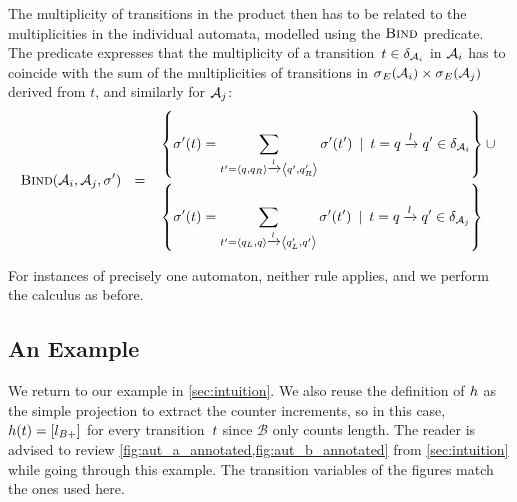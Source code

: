 The multiplicity of transitions in the product then has to be related
to the multiplicities in the individual automata, modelled using the
$\textsc{Bind}$ predicate. The predicate expresses that the multiplicity
of a transition~$t \in \delta_{\mathcal{A}_i}$ in
$\mathcal{A}_i$ has to coincide with the sum of the multiplicities of
transitions in $\operatorname{\sigma}_{E}(\mathcal{A}_i) \times \operatorname{\sigma}_{E}(\mathcal{A}_j)$ derived from $t$,
and similarly for $\mathcal{A}_j$:
%
  $$
  \textsc{Bind}(\mathcal{A}_i, \mathcal{A}_j, \operatorname{\sigma}') ~~=~~
  \begin{aligned}
  & \left\{ 
    \operatorname{\sigma}'(t)  =  \sum\limits_{t' = \left\langle q, q_R\right\rangle \xrightarrow{l} \left\langle q', q'_R\right\rangle} \operatorname{\sigma}'(t')
  \:\mid\: t = q \xrightarrow{l} q' \in \delta_{\mathcal{A}_i} \right\} \cup\mbox{} \\ 
  & \left\{
    \operatorname{\sigma}'(t)  =  \sum\limits_{t' = \left\langle q_L, q\right\rangle \xrightarrow{l} \left\langle q'_L, q'\right\rangle} \operatorname{\sigma}'(t') \:\mid\: t = q \xrightarrow{l} q' \in \delta_{\mathcal{A}_j}
  \right\}
  \end{aligned}
$$

For instances of precisely one automaton, neither rule applies, and we perform
the calculus as before.

\subsection{An Example}\label{sec:multiple:example}

We return to our example in \cref{sec:intuition}. We also reuse the
definition of $h$ as the simple projection to extract the counter increments,
so in this case, $h(t) = \left[l_{B+}\right]$ for every
transition~$t$ since $\mathcal{B}$ only counts length. The reader is
advised to review \cref{fig:aut_a_annotated,fig:aut_b_annotated} from
\cref{sec:intuition} while going through this example.
The transition variables of the figures match the ones used here.

